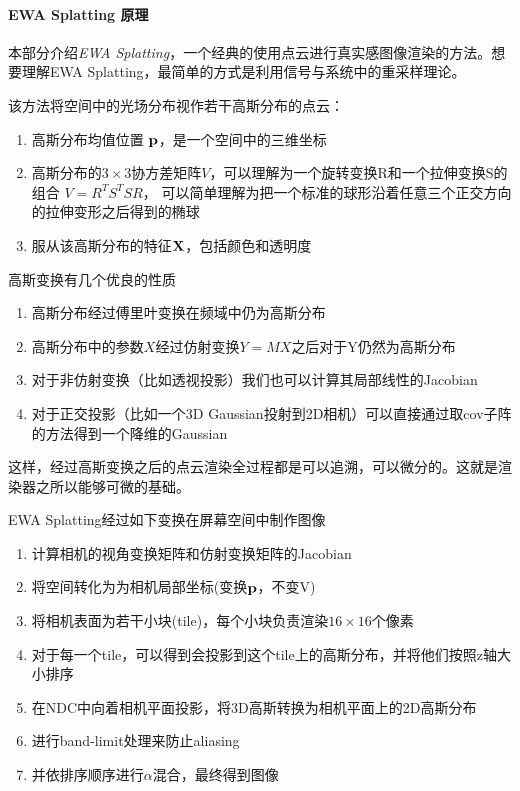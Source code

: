 \paragraph{EWA Splatting 原理}

本部分介绍\textit{EWA Splatting}，一个经典的使用点云进行真实感图像渲染的方法。想要理解EWA Splatting，最简单的方式是利用信号与系统中的重采样理论。

该方法将空间中的光场分布视作若干高斯分布的点云：

\begin{enumerate}
    \item 高斯分布均值位置 $\bf{p}$，是一个空间中的三维坐标
    \item 高斯分布的$3\times 3$协方差矩阵$V$，可以理解为一个旋转变换R和一个拉伸变换S的组合 $V=R^TS^TSR$，
        可以简单理解为把一个标准的球形沿着任意三个正交方向的拉伸变形之后得到的椭球
    \item 服从该高斯分布的特征$\bf{X}$，包括颜色和透明度 
\end{enumerate}

高斯变换有几个优良的性质

\begin{enumerate}
    \item 高斯分布经过傅里叶变换在频域中仍为高斯分布
    \item 高斯分布中的参数$X$经过仿射变换$Y=MX$之后对于Y仍然为高斯分布
    \item 对于非仿射变换（比如透视投影）我们也可以计算其局部线性的Jacobian
    \item 对于正交投影（比如一个3D Gaussian投射到2D相机）可以直接通过取cov子阵的方法得到一个降维的Gaussian
\end{enumerate}

这样，经过高斯变换之后的点云渲染全过程都是可以追溯，可以微分的。这就是渲染器之所以能够可微的基础。

EWA Splatting经过如下变换在屏幕空间中制作图像

\begin{enumerate}
    \item 计算相机的视角变换矩阵和仿射变换矩阵的Jacobian
    \item 将空间转化为为相机局部坐标(变换$\bf{p}$，不变V)
    \item 将相机表面为若干小块(tile)，每个小块负责渲染$16\times 16$个像素
    \item 对于每一个tile，可以得到会投影到这个tile上的高斯分布，并将他们按照z轴大小排序
    \item 在NDC中向着相机平面投影，将3D高斯转换为相机平面上的2D高斯分布
    \item 进行band-limit处理来防止aliasing 
    \item 并依排序顺序进行$\alpha$混合，最终得到图像
\end{enumerate}